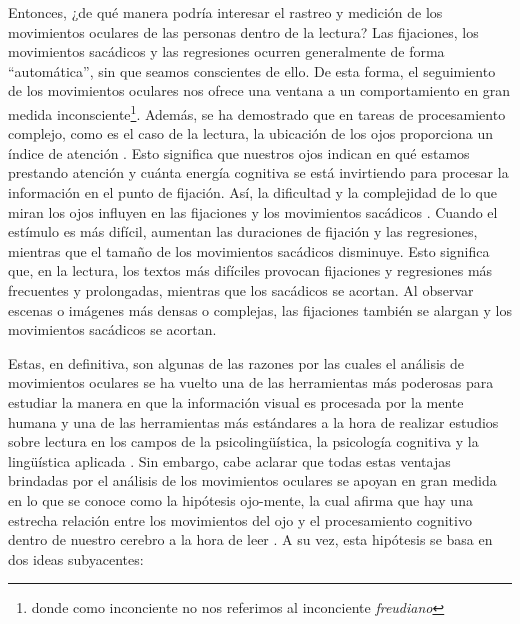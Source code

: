 Entonces, ¿de qué manera podría interesar el rastreo y medición de los movimientos oculares de las personas dentro de la lectura? Las fijaciones, los movimientos sacádicos y las regresiones ocurren generalmente de forma “automática”, sin que seamos conscientes de ello. De esta forma, el seguimiento de los movimientos oculares nos ofrece una ventana a un comportamiento en gran medida inconsciente\footnote{donde como inconciente no nos referimos al inconciente \textit{freudiano}}. Además, se ha demostrado que en tareas de procesamiento complejo, como es el caso de la lectura, la ubicación de los ojos proporciona un índice de atención \parencite{Rayner2009}. Esto significa que nuestros ojos indican en qué estamos prestando atención y cuánta energía cognitiva se está invirtiendo para procesar la información en el punto de fijación. Así, la dificultad y la complejidad de lo que miran los ojos influyen en las fijaciones y los movimientos sacádicos \parencite{CastelhanoRayner2008}. Cuando el estímulo es más difícil, aumentan las duraciones de fijación y las regresiones, mientras que el tamaño de los movimientos sacádicos disminuye. Esto significa que, en la lectura, los textos más difíciles provocan fijaciones y regresiones más frecuentes y prolongadas, mientras que los sacádicos se acortan. Al observar escenas o imágenes más densas o complejas, las fijaciones también se alargan y los movimientos sacádicos se acortan.

Estas, en definitiva, son algunas de las razones por las cuales el análisis de movimientos oculares se ha vuelto una de las herramientas más poderosas para estudiar la manera en que la información visual es procesada por la mente humana y una de las herramientas más estándares a la hora de realizar estudios sobre lectura en los campos de la psicolingüística, la psicología cognitiva y la lingüística aplicada \parencite[p. 1474]{Rayner2009}. Sin embargo, cabe aclarar que todas estas ventajas brindadas por el análisis de los movimientos oculares se apoyan en gran medida en lo que se conoce como la hipótesis ojo-mente, la cual afirma que hay una estrecha relación entre los movimientos del ojo y el procesamiento cognitivo dentro de nuestro cerebro a la hora de leer \parencite{JustCarpenter1980}. A su vez, esta hipótesis se basa en dos ideas subyacentes:


